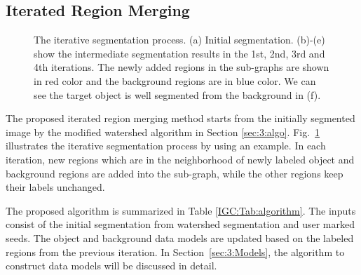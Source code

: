 \subsection{Iterated Region Merging}
    \begin{figure}[htp]
    \centering
    {
    }
    \caption{ The iterative segmentation process. (a) Initial segmentation. (b)-(e) show the intermediate segmentation results in the 1st, 2nd, 3rd and 4th iterations. The newly added regions in the sub-graphs are shown in red color and the background regions are in blue color. We can see the target object is well segmented from the background in (f). }
    \label{IGC:fig:iter}
    \end{figure}

 The proposed iterated region merging method starts from the initially segmented image by the modified watershed algorithm in Section \ref{sec:3:algo}. Fig.~\ref{IGC:fig:iter} illustrates the iterative segmentation process by using an example. In each iteration, new regions which are in the neighborhood of newly labeled object and background regions are added into the sub-graph, while the other regions keep their labels unchanged.

 The proposed algorithm is summarized in Table \ref{IGC:Tab:algorithm}. The inputs consist of the initial segmentation from watershed segmentation and user marked seeds. The object and background data models are updated based on the labeled regions from the previous iteration. In Section~\ref{sec:3:Models}, the algorithm to construct data models will be discussed in detail.

